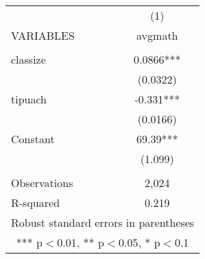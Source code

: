 \documentclass[]{article}
\begin{document}
\begin{tabular}{lc} \hline
 & (1) \\
VARIABLES & avgmath \\ \hline
 &  \\
classize & 0.0866*** \\
 & (0.0322) \\
tipuach & -0.331*** \\
 & (0.0166) \\
Constant & 69.39*** \\
 & (1.099) \\
 &  \\
Observations & 2,024 \\
 R-squared & 0.219 \\ \hline
\multicolumn{2}{c}{ Robust standard errors in parentheses} \\
\multicolumn{2}{c}{ *** p$<$0.01, ** p$<$0.05, * p$<$0.1} \\
\end{tabular}
\end{document}
